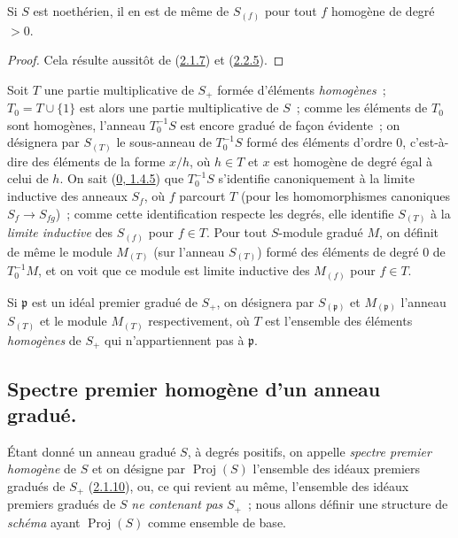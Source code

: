 \begin{corollary}[2.2.6]
\label{II.2.2.6-fr}
Si $S$ est noethérien, il en est de même de $S_{(f)}$ pour tout $f$ homogène
de degré $>0$.
\end{corollary}

\begin{proof}
Cela résulte aussitôt de (\hyperref[II.2.1.7-fr]{2.1.7}) et
(\hyperref[II.2.2.5-fr]{2.2.5}).
\end{proof}

\begin{env}[2.2.7]
\label{II.2.2.7-fr}
Soit $T$ une partie multiplicative de $S_+$ formée d'éléments
\emph{homogènes}~; $T_0=T\cup\{1\}$ est alors une partie multiplicative de
$S$~; comme les éléments de $T_0$ sont homogènes, l'anneau $T_0^{-1}S$ est
encore gradué de façon évidente~; on désignera par $S_{(T)}$ le sous-anneau
de $T_0^{-1}S$ formé des éléments d'ordre $0$, c'est-à-dire des éléments de
la forme $x/h$, où $h\in T$ et $x$ est homogène de degré égal à celui de
$h$. On sait (\hyperref[0.1.4.5-fr]{0, 1.4.5}) que $T_0^{-1}S$ s'identifie
canoniquement à la limite inductive des anneaux $S_f$, où $f$ parcourt $T$
(pour les homomorphismes canoniques $S_f\to S_{fg}$)~; comme cette
identification respecte les degrés, elle identifie $S_{(T)}$ à la
\emph{limite inductive} des $S_{(f)}$ pour $f\in T$. Pour tout $S$-module
gradué $M$, on définit de même le module $M_{(T)}$ (sur l'anneau $S_{(T)}$)
formé des éléments de degré $0$ de $T_0^{-1}M$, et on voit que ce module est
limite inductive des $M_{(f)}$ pour $f\in T$.

Si $\mathfrak{p}$ est un idéal premier gradué de $S_+$, on désignera par
$S_{(\mathfrak{p})}$ et $M_{(\mathfrak{p})}$ l'anneau $S_{(T)}$ et le
module $M_{(T)}$ respectivement, où $T$ est l'ensemble des éléments
\emph{homogènes} de $S_+$ qui n'appartiennent pas à $\mathfrak{p}$.
\end{env}

\subsection{Spectre premier homogène d'un anneau gradué.}
\label{subsection:II.2.3-fr}

\begin{env}[2.3.1]
\label{II.2.3.1-fr}
Étant donné un anneau gradué $S$, à degrés positifs, on appelle
\emph{spectre premier homogène} de $S$ et on désigne par
$\operatorname{Proj}(S)$ l'ensemble des idéaux premiers gradués de $S_+$
(\hyperref[II.2.1.10-fr]{2.1.10}), ou, ce qui revient au même, l'ensemble
des idéaux premiers gradués de $S$ \emph{ne contenant pas} $S_+$~; nous
allons définir une structure de \emph{schéma} ayant
$\operatorname{Proj}(S)$ comme ensemble de base.
\end{env}


